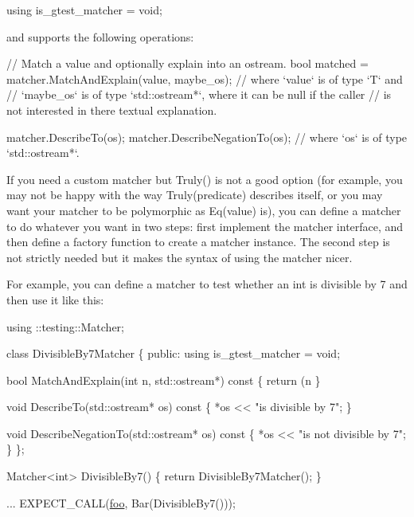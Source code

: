 \begin{DoxyCode}
\textcolor{keyword}{using} is\_gtest\_matcher = void;
\end{DoxyCode}


and supports the following operations\+:


\begin{DoxyCode}
\textcolor{comment}{// Match a value and optionally explain into an ostream.}
\textcolor{keywordtype}{bool} matched = matcher.MatchAndExplain(value, maybe\_os);
\textcolor{comment}{// where `value` is of type `T` and}
\textcolor{comment}{// `maybe\_os` is of type `std::ostream*`, where it can be null if the caller}
\textcolor{comment}{// is not interested in there textual explanation.}

matcher.DescribeTo(os);
matcher.DescribeNegationTo(os);
\textcolor{comment}{// where `os` is of type `std::ostream*`.}
\end{DoxyCode}


If you need a custom matcher but {\ttfamily Truly()} is not a good option (for example, you may not be happy with the way {\ttfamily Truly(predicate)} describes itself, or you may want your matcher to be polymorphic as {\ttfamily Eq(value)} is), you can define a matcher to do whatever you want in two steps\+: first implement the matcher interface, and then define a factory function to create a matcher instance. The second step is not strictly needed but it makes the syntax of using the matcher nicer.

For example, you can define a matcher to test whether an {\ttfamily int} is divisible by 7 and then use it like this\+:


\begin{DoxyCode}
using ::testing::Matcher;

\textcolor{keyword}{class }DivisibleBy7Matcher \{
 \textcolor{keyword}{public}:
  \textcolor{keyword}{using} is\_gtest\_matcher = void;

  \textcolor{keywordtype}{bool} MatchAndExplain(\textcolor{keywordtype}{int} n, std::ostream*)\textcolor{keyword}{ const }\{
    \textcolor{keywordflow}{return} (n %
  \}

  \textcolor{keywordtype}{void} DescribeTo(std::ostream* os)\textcolor{keyword}{ const }\{
    *os << \textcolor{stringliteral}{"is divisible by 7"};
  \}

  \textcolor{keywordtype}{void} DescribeNegationTo(std::ostream* os)\textcolor{keyword}{ const }\{
    *os << \textcolor{stringliteral}{"is not divisible by 7"};
  \}
\};

Matcher<int> DivisibleBy7() \{
  \textcolor{keywordflow}{return} DivisibleBy7Matcher();
\}

...
  EXPECT\_CALL(\mbox{\hyperlink{namespacefoo}{foo}}, Bar(DivisibleBy7()));
\end{DoxyCode}


